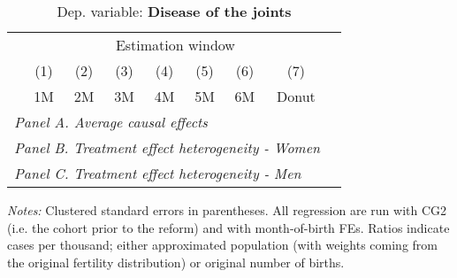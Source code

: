 \begin{table}[H] \begin{threeparttable} \centering \caption{Dep. variable: \textbf{Disease of the joints}} {\def\sym#1{\ifmmode^{#1}\else\(^{#1}\)\fi} \begin{tabular}{l*{8}{c}} \toprule & \multicolumn{7}{c}{Estimation window} \\ \cmidrule(lr){2-8}
            &\multicolumn{1}{c}{(1)}&\multicolumn{1}{c}{(2)}&\multicolumn{1}{c}{(3)}&\multicolumn{1}{c}{(4)}&\multicolumn{1}{c}{(5)}&\multicolumn{1}{c}{(6)}&\multicolumn{1}{c}{(7)}\\
            &\multicolumn{1}{c}{1M}&\multicolumn{1}{c}{2M}&\multicolumn{1}{c}{3M}&\multicolumn{1}{c}{4M}&\multicolumn{1}{c}{5M}&\multicolumn{1}{c}{6M}&\multicolumn{1}{c}{Donut}\\
\midrule
 \multicolumn{8}{l}{\emph{Panel A. Average causal effects}} \\       \midrule\multicolumn{8}{l}{\emph{Panel B. Treatment effect heterogeneity - Women}} \\       \midrule\multicolumn{8}{l}{\emph{Panel C. Treatment effect heterogeneity - Men}} \\       
\bottomrule \end{tabular} } \begin{tablenotes} \item \scriptsize \emph{Notes:} Clustered standard errors in parentheses. All regression are run with CG2 (i.e. the cohort prior to the reform) and with month-of-birth FEs. Ratios indicate cases per thousand; either approximated population (with weights coming from the original fertility distribution) or original number of births. \end{tablenotes} \end{threeparttable} \end{table} 
